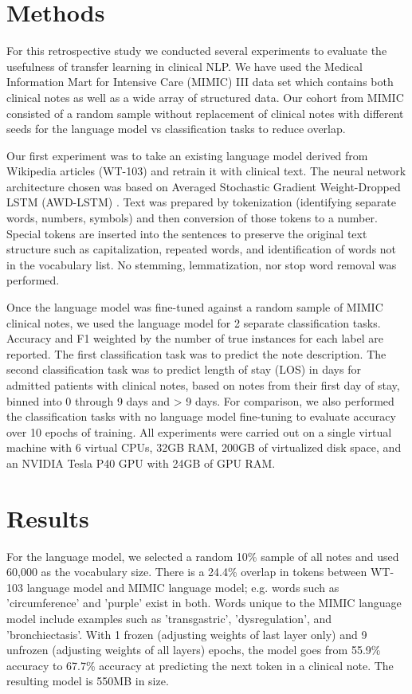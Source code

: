 \documentclass{amia}
\begin{document}
\section*{Methods}

For this retrospective study we conducted several experiments to evaluate the usefulness of transfer learning in clinical NLP. We have used the Medical Information Mart for Intensive Care (MIMIC) III \cite{johnson_mimic-iii_2016} data set which contains both clinical notes as well as a wide array of structured data. Our cohort from MIMIC consisted of a random sample without replacement of clinical notes with different seeds for the language model vs classification tasks to reduce overlap.

Our first experiment was to take an existing language model derived from Wikipedia articles (WT-103) \cite{Merity2016Sep} and retrain it with clinical text. The neural network architecture chosen was based on Averaged Stochastic Gradient Weight-Dropped LSTM (AWD-LSTM) \cite{Merity2017Aug}. Text was prepared by tokenization (identifying separate words, numbers, symbols) and then conversion of those tokens to a number. Special tokens are inserted into the sentences to preserve the original text structure such as capitalization, repeated words, and identification of words not in the vocabulary list. No stemming, lemmatization, nor stop word removal was performed.

Once the language model was fine-tuned against a random sample of MIMIC clinical notes, we used the language model for 2 separate classification tasks. Accuracy and F1 weighted by the number of true instances for each label are reported. The first classification task was to predict the note description. The second classification task was to predict length of stay (LOS) in days for admitted patients with clinical notes, based on notes from their first day of stay, binned into 0 through 9 days and > 9 days. For comparison, we also performed the classification tasks with no language model fine-tuning to evaluate accuracy over 10 epochs of training. All experiments were carried out on a single virtual machine with 6 virtual CPUs, 32GB RAM, 200GB of virtualized disk space, and an NVIDIA Tesla P40 GPU with 24GB of GPU RAM.

\section*{Results}

For the language model, we selected a random 10\% sample of all notes and used 60,000 as the vocabulary size. There is a 24.4\% overlap in tokens between WT-103 language model and MIMIC language model; e.g. words such as 'circumference' and 'purple' exist in both. Words unique to the MIMIC language model include examples such as 'transgastric', 'dysregulation', and 'bronchiectasis'. With 1 frozen (adjusting weights of last layer only) and 9 unfrozen (adjusting weights of all layers) epochs, the model goes from 55.9\% accuracy to 67.7\% accuracy at predicting the next token in a clinical note. The resulting model is 550MB in size.
\end{document}

